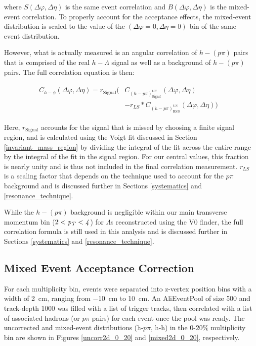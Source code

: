 \documentclass[ALICE,manyauthors]{ALICE_analysis_notes}
\begin{document}
where $S(\Delta\varphi, \Delta\eta)$ is the same event correlation and $B(\Delta\varphi, \Delta\eta)$ is the mixed-event correlation.  To properly account for the acceptance effects, the mixed-event distribution is scaled to the value of the $(\Delta\varphi = 0, \Delta\eta = 0)$ bin of the same event distribution. 


However, what is actually measured is an angular correlation of $h-(p\pi)$ pairs that is comprised of the real $h-\Lambda$ signal as well as a background of $h-(p\pi)$ pairs. The full correlation equation is then:

\begin{align}
\label{corrEq_withBG}
\begin{split}
    C_{h-\phi}(\Delta\varphi, \Delta\eta) = r_{\text{Signal}}\biggl(&C_{(h-p\pi)^{US}_{\text{Signal}}}(\Delta\varphi, \Delta\eta)\\
    &- r_{LS}*C_{(h-p\pi)^{US}_{\text{RSB}}}(\Delta\varphi, \Delta\eta)\biggr)
\end{split}
\end{align}

Here, $r_{\text{Signal}}$ accounts for the signal that is missed by choosing a finite signal region, and is calculated using the Voigt fit discussed in Section \ref{invariant_mass_region} by dividing the integral of the fit across the entire range by the integral of the fit in the signal region. For our central values, this fraction is nearly unity and is thus not included in the final correlation measurement. $r_{LS}$ is a scaling factor that depends on the technique used to account for the $p\pi$ background and is discussed further in Sections \ref{systematics} and \ref{resonance_technique}.


While the $h-(p\pi)$ background is negligible within our main transverse momentum bin ($2 < \it{p}_{T} < 4$) for $\Lambda$s reconstructed using the V0 finder, the full correlation formula is still used in this analysis and is discussed further in Sections \ref{systematics} and \ref{resonance_technique}.

\subsection{Mixed Event Acceptance Correction}
\label{mixed_event_correction}

For each multiplicity bin, events were separated into z-vertex position bins with a width of \SI{2}{cm}, ranging from \SI{-10}{cm} to \SI{10}{cm}. An AliEventPool of size 500 and track-depth 1000 was filled with a list of trigger tracks, then correlated with a list of associated hadrons (or $p\pi$ pairs) for each event once the pool was ready. The uncorrected and mixed-event distributions (h-$p\pi$, h-h) in the 0-20\% multiplicity bin are shown in Figures \ref{uncorr2d_0_20} and \ref{mixed2d_0_20}, respectively.
\end{document}

